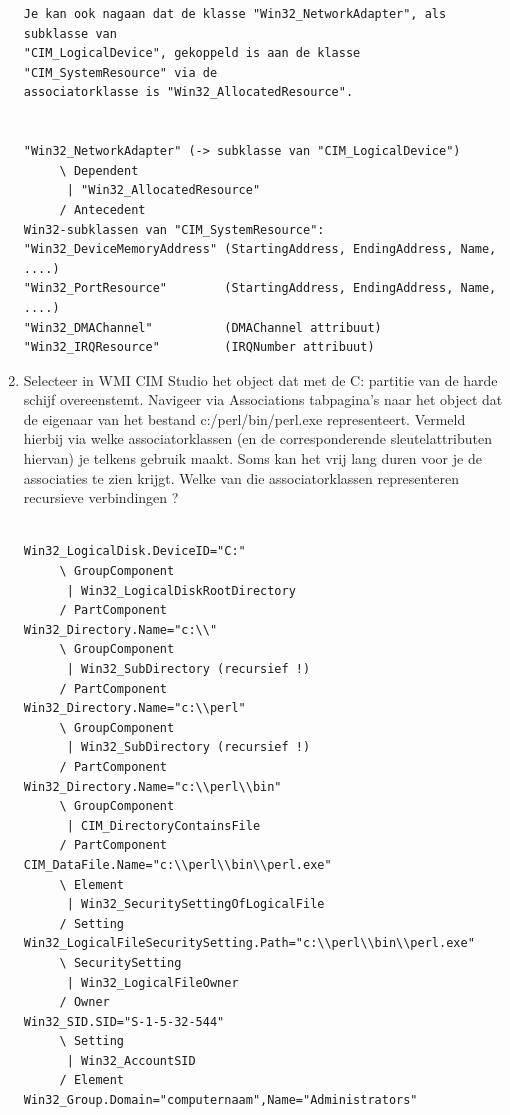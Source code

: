 \documentclass[11pt,a4paper]{report}
\begin{document}
\begin{enumerate}[resume]
\begin{lstlisting}
Je kan ook nagaan dat de klasse "Win32_NetworkAdapter", als subklasse van 
"CIM_LogicalDevice", gekoppeld is aan de klasse "CIM_SystemResource" via de 
associatorklasse is "Win32_AllocatedResource".


"Win32_NetworkAdapter" (-> subklasse van "CIM_LogicalDevice")
     \ Dependent
      | "Win32_AllocatedResource"
     / Antecedent
Win32-subklassen van "CIM_SystemResource":
"Win32_DeviceMemoryAddress" (StartingAddress, EndingAddress, Name, ....)
"Win32_PortResource"        (StartingAddress, EndingAddress, Name, ....)
"Win32_DMAChannel"          (DMAChannel attribuut)
"Win32_IRQResource"         (IRQNumber attribuut)	
	\end{lstlisting}
	\item Selecteer in WMI CIM Studio het object dat met de C: partitie van de harde schijf overeenstemt. Navigeer via Associations tabpagina's naar het object dat de eigenaar van het bestand c:/perl/bin/perl.exe representeert. Vermeld hierbij via welke associatorklassen (en de corresponderende sleutelattributen hiervan) je telkens gebruik maakt. Soms kan het vrij lang duren voor je de associaties te zien krijgt. Welke van die associatorklassen representeren recursieve verbindingen ?
	\begin{lstlisting}

Win32_LogicalDisk.DeviceID="C:"
     \ GroupComponent
      | Win32_LogicalDiskRootDirectory
     / PartComponent
Win32_Directory.Name="c:\\"
     \ GroupComponent
      | Win32_SubDirectory (recursief !)
     / PartComponent
Win32_Directory.Name="c:\\perl"
     \ GroupComponent
      | Win32_SubDirectory (recursief !)
     / PartComponent
Win32_Directory.Name="c:\\perl\\bin"
     \ GroupComponent
      | CIM_DirectoryContainsFile
     / PartComponent
CIM_DataFile.Name="c:\\perl\\bin\\perl.exe"
     \ Element
      | Win32_SecuritySettingOfLogicalFile
     / Setting
Win32_LogicalFileSecuritySetting.Path="c:\\perl\\bin\\perl.exe"
     \ SecuritySetting
      | Win32_LogicalFileOwner 
     / Owner
Win32_SID.SID="S-1-5-32-544"
     \ Setting
      | Win32_AccountSID 
     / Element
Win32_Group.Domain="computernaam",Name="Administrators"
	\end{lstlisting}
\end{enumerate}
\end{document}
